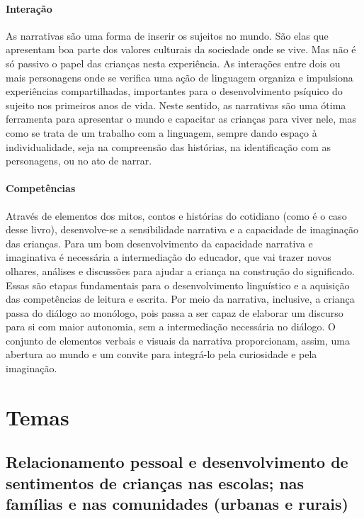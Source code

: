 \documentclass[11pt]{extarticle}
\begin{document}
\paragraph{Interação} As narrativas são uma forma de inserir os sujeitos no mundo. 
São elas que apresentam boa parte dos valores culturais da sociedade 
onde se vive. Mas não é só passivo o papel das crianças nesta experiência. 
As interações entre dois ou mais personagens onde se verifica
uma ação de linguagem organiza e impulsiona experiências compartilhadas,
importantes para o desenvolvimento psíquico do sujeito nos primeiros anos de vida.
Neste sentido, as narrativas são uma ótima ferramenta para
apresentar o mundo e capacitar as crianças para viver nele, mas como se
trata de um trabalho com a linguagem, sempre dando espaço à individualidade, 
seja na compreensão das histórias, na identificação com as personagens, ou 
no ato de narrar.

\paragraph{Competências} 
Através de elementos dos mitos, contos e histórias do cotidiano (como é o caso desse livro), desenvolve-se a sensibilidade narrativa e a capacidade de imaginação das crianças. Para um bom desenvolvimento da capacidade narrativa e imaginativa é necessária a intermediação do educador, que vai trazer novos olhares, análises e discussões para ajudar a criança na construção do significado. Essas são etapas fundamentais para o desenvolvimento linguístico e a aquisição das competências de leitura e escrita. Por meio da narrativa, inclusive, a criança passa do diálogo ao monólogo, pois passa a ser capaz de elaborar um discurso para si com maior autonomia, sem a intermediação necessária no diálogo.
O conjunto de elementos verbais e visuais da narrativa proporcionam, assim,
uma abertura ao mundo e um convite para integrá-lo pela curiosidade e pela imaginação.


\section{Temas}

\subsection{Relacionamento pessoal e desenvolvimento de sentimentos de crianças nas escolas; nas famílias e nas comunidades (urbanas e rurais)}
\end{document}
